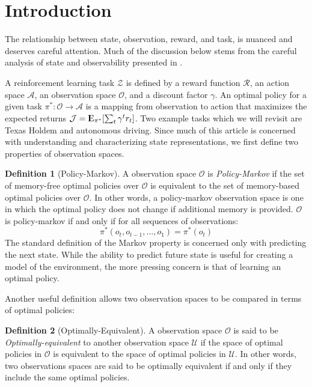 \documentclass{article} %
\newcommand{\Expect}{{\rm I\kern-.3em E}}
\theoremstyle{definition}
\newtheorem{definition}{Definition}[section]
\begin{document}
\section{Introduction}
The relationship between state, observation, reward, and task, is
nuanced and deserves careful attention. Much of the discussion below
stems from the careful analysis of state and observability presented
in \cite{McCallum96}.

A reinforcement learning task $\mathcal{Z}$ is defined by a reward
function $\mathcal{R}$, an action space $\mathcal{A}$, an observation
space $\mathcal{O}$, and a discount factor $\gamma$. An optimal policy
for a given task $\pi^*: \mathcal{O} \rightarrow \mathcal{A}$ is a
mapping from observation to action that maximizes the expected returns
$\mathcal{J} = \Expect_{\pi^*}[\sum_{t} \gamma^t r_t]$. Two example
tasks which we will revisit are Texas Holdem and autonomous
driving. Since much of this article is concerned with understanding
and characterizing state representations, we first define two
properties of observation spaces.

\begin{definition}[Policy-Markov]
A observation space $\mathcal{O}$ is \textit{Policy-Markov} if the set
of memory-free optimal policies over $\mathcal{O}$ is equivalent to
the set of memory-based optimal policies over $\mathcal{O}$. In other
words, a policy-markov observation space is one in which the optimal
policy does not change if additional memory is provided. $\mathcal{O}$
is policy-markov if and only if for all sequences of observations:
\[
\pi^*(o_{t}, o_{t-1}, \dots, o_{1}) = \pi^*(o_{t})
\]
The standard definition of the Markov property is concerned only with
predicting the next state. While the ability to predict future state
is useful for creating a model of the environment, the more pressing
concern is that of learning an optimal policy.
\end{definition}

Another useful definition allows two observation spaces to be compared
in terms of optimal policies:

\begin{definition}[Optimally-Equivalent]
A observation space $\mathcal{O}$ is said to be
\textit{Optimally-equivalent} to another observation space
$\mathcal{U}$ if the space of optimal policies in $\mathcal{O}$ is
equivalent to the space of optimal policies in $\mathcal{U}$. In other
words, two observations spaces are said to be optimally equivalent if
and only if they include the same optimal policies.
\end{definition}
\end{document}
